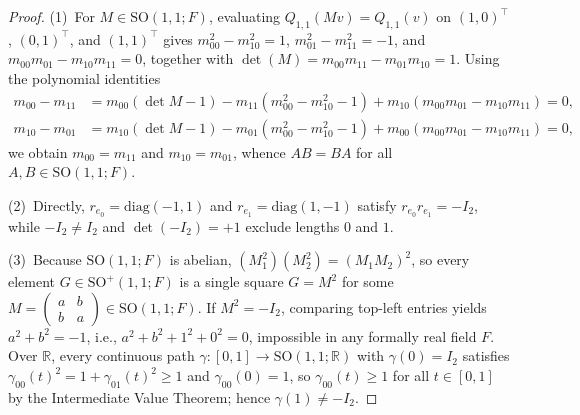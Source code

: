 \documentclass[11pt,a4paper]{article}
\theoremstyle{plain}
\theoremstyle{definition}
\newcommand{\R}{\mathbb{R}}
\newcommand{\SO}{\mathrm{SO}}
\begin{document}
\begin{proof}
(1)~For $M \in \SO(1, 1; F)$, evaluating $Q_{1,1}(M v) = Q_{1,1}(v)$ on $(1, 0)^\top$, $(0, 1)^\top$, and $(1, 1)^\top$ gives $m_{00}^2 - m_{10}^2 = 1$, $m_{01}^2 - m_{11}^2 = -1$, and $m_{00} m_{01} - m_{10} m_{11} = 0$, together with $\det(M) = m_{00} m_{11} - m_{01} m_{10} = 1$. Using the polynomial identities
\begin{align*}
  m_{00} - m_{11} &= m_{00}(\det M - 1) - m_{11}(m_{00}^2 - m_{10}^2 - 1) + m_{10}(m_{00} m_{01} - m_{10} m_{11}) = 0,\\
  m_{10} - m_{01} &= m_{10}(\det M - 1) - m_{01}(m_{00}^2 - m_{10}^2 - 1) + m_{00}(m_{00} m_{01} - m_{10} m_{11}) = 0,
\end{align*}
we obtain $m_{00} = m_{11}$ and $m_{10} = m_{01}$, whence $A B = B A$ for all $A, B \in \SO(1, 1; F)$.

(2)~Directly, $r_{e_0} = \mathrm{diag}(-1, 1)$ and $r_{e_1} = \mathrm{diag}(1, -1)$ satisfy $r_{e_0} r_{e_1} = -I_2$, while $-I_2 \neq I_2$ and $\det(-I_2) = +1$ exclude lengths $0$ and $1$.

(3)~Because $\SO(1, 1; F)$ is abelian, $(M_1^2)(M_2^2) = (M_1 M_2)^2$, so every element $G \in \SO^+(1, 1; F)$ is a single square $G = M^2$ for some $M = \begin{pmatrix}a & b\\ b & a\end{pmatrix} \in \SO(1, 1; F)$. If $M^2 = -I_2$, comparing top-left entries yields $a^2 + b^2 = -1$, i.e., $a^2 + b^2 + 1^2 + 0^2 = 0$, impossible in any formally real field $F$. Over $\R$, every continuous path $\gamma : [0, 1] \to \SO(1, 1; \R)$ with $\gamma(0) = I_2$ satisfies $\gamma_{00}(t)^2 = 1 + \gamma_{01}(t)^2 \ge 1$ and $\gamma_{00}(0) = 1$, so $\gamma_{00}(t) \ge 1$ for all $t \in [0, 1]$ by the Intermediate Value Theorem; hence $\gamma(1) \neq -I_2$.
\end{proof}
\end{document}

